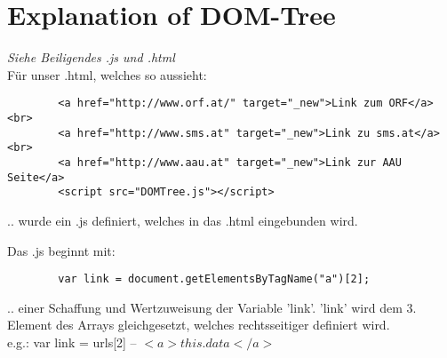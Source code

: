 \documentclass[11pt]{article}
\begin{document}
    \section{Explanation of DOM-Tree}
    \emph{Siehe Beiligendes .js und .html}\\
    Für unser .html, welches so aussieht:
    \begin{verbatim}
        <a href="http://www.orf.at/" target="_new">Link zum ORF</a><br>
        <a href="http://www.sms.at" target="_new">Link zu sms.at</a><br>
        <a href="http://www.aau.at" target="_new">Link zur AAU Seite</a>
        <script src="DOMTree.js"></script>
    \end{verbatim}
    .. wurde ein .js definiert, welches in das .html eingebunden wird.

    Das .js beginnt mit:
    \begin{verbatim}
        var link = document.getElementsByTagName("a")[2];
    \end{verbatim}
    .. einer Schaffung und Wertzuweisung der Variable 'link'.
    'link' wird dem 3. Element des Arrays gleichgesetzt, welches rechtsseitiger definiert wird.\\
    e.g.: var link = urls[2] -- $<a> this.data </a>$
\end{document}
